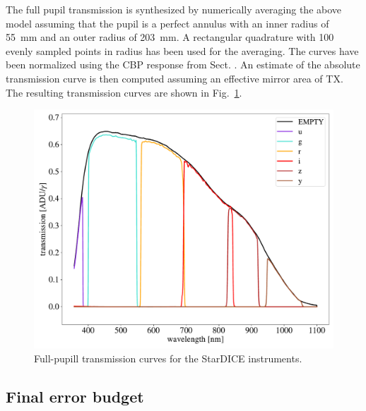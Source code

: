 The full pupil transmission is synthesized by numerically averaging
the above model assuming that the pupil is a perfect annulus with an
inner radius of \SI{55}{mm} and an outer radius of \SI{203}{mm}. A
rectangular quadrature with 100 evenly sampled points in radius has
been used for the averaging. The curves have been normalized using the
CBP response from Sect. .  An estimate of the
absolute transmission curve is then computed assuming an effective
mirror area of TX. The resulting transmission curves are shown in
Fig.~\ref{fig:fullpupiltrans}.
\begin{figure}
  \centering
  \includegraphics[width=1\linewidth]{fig/fullpupill.pdf}
  \caption{Full-pupill transmission curves for the StarDICE instruments.}
  \label{fig:fullpupiltrans}
\end{figure}


\subsection{Final error budget}

